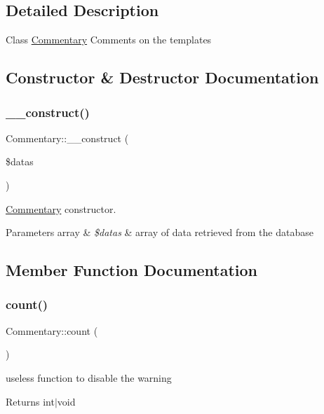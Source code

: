\subsection{Detailed Description}
Class \hyperlink{classCommentary}{Commentary} Comments on the templates 

\subsection{Constructor \& Destructor Documentation}
\mbox{\label{classCommentary_a3764ce9114bec19e6e3c8d18872dd45e}} 
\subsubsection{\texorpdfstring{\+\_\+\+\_\+construct()}{\_\_construct()}}
{\footnotesize\ttfamily Commentary\+::\+\_\+\+\_\+construct (\begin{DoxyParamCaption}\item[{}]{\$datas }\end{DoxyParamCaption})}

\hyperlink{classCommentary}{Commentary} constructor. 
\begin{DoxyParams}[1]{Parameters}
array & {\em \$datas} & array of data retrieved from the database \\
\hline
\end{DoxyParams}


\subsection{Member Function Documentation}
\mbox{\label{classCommentary_a8f8443760c23ed2ca2f3d44d73c83f7a}} 
\subsubsection{\texorpdfstring{count()}{count()}}
{\footnotesize\ttfamily Commentary\+::count (\begin{DoxyParamCaption}{ }\end{DoxyParamCaption})}

useless function to disable the warning \begin{DoxyReturn}{Returns}
int$\vert$void 
\end{DoxyReturn}
\mbox{\label{classCommentary_aadea30157d513b527365a472b029b9b8}} 
